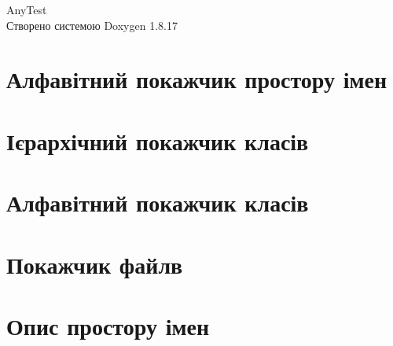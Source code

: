 \let\mypdfximage\pdfximage\def\pdfximage{\immediate\mypdfximage}\documentclass[twoside]{book}
\newcommand{\+}{\discretionary{\mbox{\scriptsize$\hookleftarrow$}}{}{}}
\newcommand{\clearemptydoublepage}{%
  \newpage{\pagestyle{empty}\cleardoublepage}%
}
\begin{document}
\hypersetup{pageanchor=false,
             bookmarksnumbered=true,
             pdfencoding=unicode
            }
\begin{titlepage}
\vspace*{7cm}
\begin{center}%
{\Large Any\+Test }\\
\vspace*{1cm}
{\large Створено системою Doxygen 1.8.17}\\
\end{center}
\end{titlepage}
\clearemptydoublepage
{}
\tableofcontents
\clearemptydoublepage
{}
\hypersetup{pageanchor=true}

\chapter{Алфавітний покажчик простору імен}

\chapter{Ієрархічний покажчик класів}

\chapter{Алфавітний покажчик класів}

\chapter{Покажчик файлв}

\chapter{Опис простору імен}



















\end{document}
